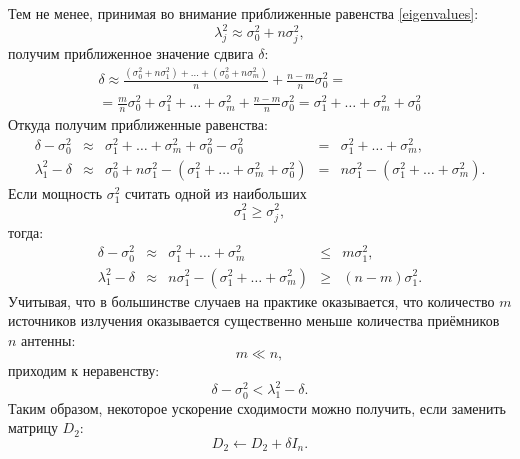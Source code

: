 Тем не менее, принимая во внимание приближенные равенства \eqref{eigenvalues}:
\[
    \lambda_j^2 \approx \sigma_0^2 + n \sigma_j^2 ,
\]
получим приближенное значение сдвига $\delta$:
\begin{multline*}
    \delta
    \approx \frac{(\sigma_0^2 + n \sigma_1^2) + \dots + (\sigma_0^2 + n \sigma_m^2)}{n} + \frac{n-m}{n} \sigma_0^2 = \\
    = \frac{m}{n} \sigma_0^2 + \sigma_1^2 + \dots + \sigma_m^2 + \frac{n-m}{n} \sigma_0^2
    = \sigma_1^2 + \dots + \sigma_m^2 + \sigma_0^2
\end{multline*}
Откуда получим приближенные равенства:
\[
    \begin{array}{lclcl}
        \delta - \sigma_0^2  & \approx & \sigma_1^2 + \dots + \sigma_m^2 + \sigma_0^2 - \sigma_0^2                    & = & \sigma_1^2 + \dots + \sigma_m^2 ,                    \\
        \lambda_1^2 - \delta & \approx & \sigma_0^2 + n \sigma_1^2 - ( \sigma_1^2 + \dots + \sigma_m^2 + \sigma_0^2 ) & = & n \sigma_1^2 - ( \sigma_1^2 + \dots + \sigma_m^2 ) .
    \end{array}
\]
Если мощность $\sigma_1^2$ считать одной из наибольших
\[
    \sigma_1^2 \ge \sigma_j^2,
\]
тогда:
\[
    \begin{array}{lclcl}
        \delta - \sigma_0^2  & \approx & \sigma_1^2 + \dots + \sigma_m^2                    & \le & m \sigma_1^2,       \\
        \lambda_1^2 - \delta & \approx & n \sigma_1^2 - ( \sigma_1^2 + \dots + \sigma_m^2 ) & \ge & (n - m) \sigma_1^2.
    \end{array}
\]
Учитывая, что в большинстве случаев на практике оказывается, что количество $m$ источников излучения оказывается существенно меньше количества приёмников $n$ антенны:
\[
    m \ll n ,
\]
приходим к неравенству:
\[
    \delta - \sigma_0^2 < \lambda_1^2 - \delta .
\]
Таким образом, некоторое ускорение сходимости можно получить, если заменить матрицу $D_2$:
\[
    D_2 \leftarrow D_2 + \delta I_n.
\]
